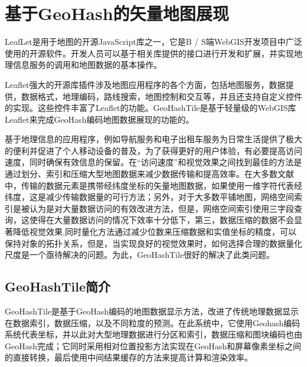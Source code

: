 %
%
%
%
%
%
\chapter{基于GeoHash的矢量地图展现}
LeafLet\cite{leafletweb}是用于地图的开源JavaScript库之一，它是B / S端WebGIS开发项目中广泛使用的开源软件。开发人员可以基于相关库提供的接口进行开发和扩展，并实现地理信息服务的调用和地图数据的基本操作\cite{edler2019simplicity}。

Leaflet强大的开源库插件涉及地图应用程序的各个方面，包括地图服务，数据提供，数据格式，地理编码，路线搜索，地图控制和交互等，并且还支持自定义控件的实现。这些控件丰富了Leaflet的功能\cite{brambilla2016adgt}。GeoHashTile是基于轻量级的WebGIS库Leaflet来完成GeoHash编码地图数据展现的功能的。

基于地理信息的应用程序，例如导航服务和电子出租车服务为日常生活提供了极大的便利并促进了个人移动设备的普及\cite{li2018bringing}，为了获得更好的用户体验，有必要提高访问速度，同时确保有效信息的保留。在“访问速度”和视觉效果之间找到最佳的方法是通过划分、索引和压缩大型地图数据来减少数据传输和提高效率。在大多数文献中，传输的数据元素是携带经纬度坐标的矢量地图数据，如果使用一维字符代表经纬度，这是减少传输数据量的可行方法；另外，对于大多数平铺地图，网络空间索引是被认为是对大量数据访问的有效改进方法，但是，网络空间索引使用三字段查询，这使得在大量数据访问的情况下效率十分低下，第三，数据压缩的数据不会显著降低视觉效果,同时量化方法通过减少位数来压缩数据和实值坐标的精度，可以保持对象的拓扑关系，但是，当实现良好的视觉效果时，如何选择合理的数据量化尺度是一个亟待解决的问题\cite{lawder2000using}。为此，GeoHashTile很好的解决了此类问题。

\section{GeoHashTile简介}
GeoHashTile是基于GeoHash编码的地图数据显示方法，改进了传统地理数据显示在数据索引，数据压缩，以及不同粒度的预测\cite{zhou2020geohashtile}。在此系统中，它使用Geohash编码系统代表坐标，并以此对大型地理数据进行分区和索引，数据压缩和图块编码也由GeoHash完成；它同时采用相对位置投影方法实现在GeoHash和屏幕像素坐标之间的直接转换，最后使用中间结果缓存的方法来提高计算和渲染效率。
